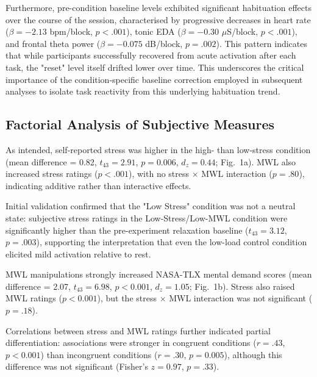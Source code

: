 \documentclass[lettersize,journal]{IEEEtran}
\begin{document}
Furthermore, pre-condition baseline levels exhibited significant habituation effects over the course of the session, characterised by progressive decreases in heart rate ($\beta = -2.13$ bpm/block, $p < .001$), tonic EDA ($\beta = -0.30$ $\mu$S/block, $p < .001$), and frontal theta power ($\beta = -0.075$ dB/block, $p = .002$). This pattern indicates that while participants successfully recovered from acute activation after each task, the "reset" level itself drifted lower over time. This underscores the critical importance of the condition-specific baseline correction employed in subsequent analyses to isolate task reactivity from this underlying habituation trend.

\subsection{Factorial Analysis of Subjective Measures}

As intended, self-reported stress was higher in the high- than low-stress condition (mean difference = 0.82, $t_{43}=2.91$, $p = 0.006$, $d_z = 0.44$; Fig.~1a). MWL also increased stress ratings ($p < .001$), with no stress × MWL interaction ($p = .80$), indicating additive rather than interactive effects. 

Initial validation confirmed that the "Low Stress" condition was not a neutral state: subjective stress ratings in the Low-Stress/Low-MWL condition were significantly higher than the pre-experiment relaxation baseline ($t_{43}=3.12$, $p=.003$), supporting the interpretation that even the low-load control condition elicited mild activation relative to rest.

MWL manipulations strongly increased NASA-TLX mental demand scores (mean difference = 2.07, $t_{43}=6.98$, $p < 0.001$, $d_z = 1.05$; Fig.~1b). Stress also raised MWL ratings ($p < 0.001$), but the stress × MWL interaction was not significant ($p = .18$). 

Correlations between stress and MWL ratings further indicated partial differentiation: associations were stronger in congruent conditions ($r = .43$, $p < 0.001$) than incongruent conditions ($r = .30$, $p = 0.005$), although this difference was not significant (Fisher’s $z = 0.97$, $p = .33$).
\end{document}
